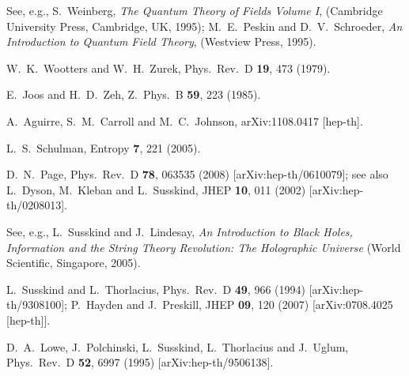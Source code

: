 \documentclass[12pt]{article}
\begin{document}
\begin{thebibliography}{99}
See, e.g.,
S.~Weinberg,
{\it The Quantum Theory of Fields Volume I},
(Cambridge University Press, Cambridge, UK, 1995);
M.~E.~Peskin and D.~V.~Schroeder,
{\it An Introduction to Quantum Field Theory},
(Westview Press, 1995).

W.~K.~Wootters and W.~H.~Zurek,
Phys.\ Rev.\  D {\bf 19}, 473 (1979).

E.~Joos and H.~D.~Zeh,
Z.\ Phys.\  B {\bf 59}, 223 (1985).

A.~Aguirre, S.~M.~Carroll and M.~C.~Johnson,
arXiv:1108.0417 [hep-th].

L.~S.~Schulman,
Entropy {\bf 7}, 221 (2005).

D.~N.~Page,
Phys.\ Rev.\ D {\bf 78}, 063535 (2008)
[arXiv:hep-th/0610079];
see also
L.~Dyson, M.~Kleban and L.~Susskind,
JHEP {\bf 10}, 011 (2002)
[arXiv:hep-th/0208013].

See, e.g.,
L.~Susskind and J.~Lindesay,
{\it An Introduction to Black Holes, Information and the String Theory 
 Revolution: The Holographic Universe}
(World Scientific, Singapore, 2005).

L.~Susskind and L.~Thorlacius,
Phys.\ Rev.\  D {\bf 49}, 966 (1994)
[arXiv:hep-th/9308100];
P.~Hayden and J.~Preskill,
JHEP {\bf 09}, 120 (2007)
[arXiv:0708.4025 [hep-th]].

D.~A.~Lowe, J.~Polchinski, L.~Susskind, L.~Thorlacius and J.~Uglum,
Phys.\ Rev.\  D {\bf 52}, 6997 (1995)
[arXiv:hep-th/9506138].


\end{thebibliography}
\end{document}
